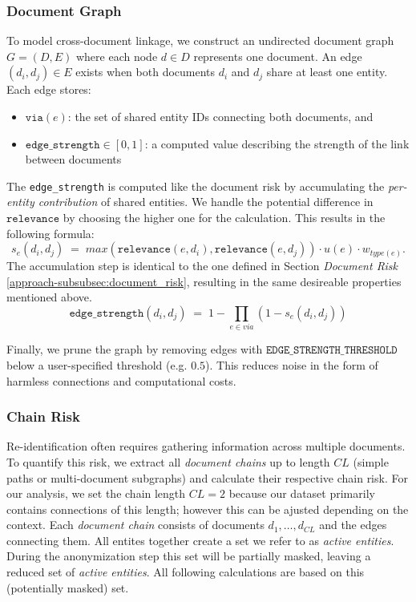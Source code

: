 \subsubsection{Document Graph}
To model cross-document linkage, we construct an undirected document graph $G=(D,E)$ where each node $d\in D$ represents one document. An edge $(d_i,d_j)\in E$ exists when both documents $d_i$ and $d_j$ share at least one entity. Each edge stores:
\begin{itemize}
    \item $\texttt{via}(e)$: the set of shared entity IDs connecting both documents, and
    \item $\texttt{edge\_strength}\in[0,1]$: a computed value describing the strength of the link between documents
\end{itemize}
The \texttt{edge\_strength} is computed like the document risk by accumulating the \textit{per-entity contribution} of shared entities. We handle the potential difference in $\texttt{relevance}$ by choosing the higher one for the calculation. This results in the following formula:
\[
    s_e(d_i, d_j) \; =\; max(\texttt{relevance}(e,d_i), \texttt{relevance}(e,d_j)) \cdot u(e) \cdot w_{type(e)}.
\]
The accumulation step is identical to the one defined in Section \textit{Document Risk} \ref{approach-subsubsec:document_risk}, resulting in the same desireable properties mentioned above.
\[
    \texttt{edge\_strength}(d_i,d_j) \;=\; 1 - \prod_{e\in{via}}(1 - s_e(d_i,d_j))
\]

Finally, we prune the graph by removing edges with $\texttt{EDGE\_STRENGTH\_THRESHOLD}$ below a user-specified threshold (e.g. $0.5$). This reduces noise in the form of harmless connections and computational costs.
\subsubsection{Chain Risk}\label{approach-subsubsec:chain_risk}
Re-identification often requires gathering information across multiple documents. To quantify this risk, we extract all \textit{document chains} up to length $CL$ (simple paths or multi-document subgraphs) and calculate their respective chain risk. For our analysis, we set the chain length $CL=2$ because our dataset primarily contains connections of this length; however this can be ajusted depending on the context. Each \textit{document chain} consists of documents $d_1,\dots,d_{CL}$ and the edges connecting them. All entites together create a set we refer to as \textit{active entities}. During the anonymization step this set will be partially masked, leaving a reduced set of \textit{active entities}. All following calculations are based on this (potentially masked) set.

